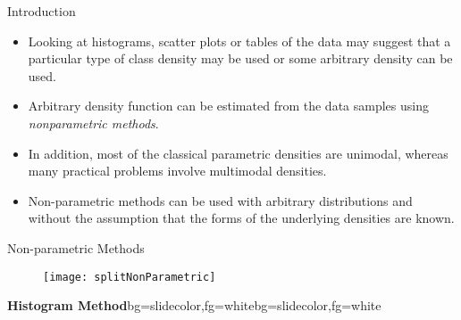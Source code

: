\begin{frame}{Introduction}
\begin{itemize}
\setlength{\itemsep}{8pt}
\item Looking at histograms, scatter plots or tables of the data may suggest that a particular type of class density may be used or {\color{mycolor2}some arbitrary density} can be used.
\item Arbitrary density function can be estimated from the data samples using \textit{\color{mycolor1}nonparametric methods}.
\item  In addition, most of the classical parametric densities are
{\color{mycolor2}unimodal}, whereas many practical problems involve {\color{mycolor2}multimodal} densities.
\item Non-parametric methods can be used with arbitrary
distributions and without the assumption that the forms of
the underlying densities are known.
\end{itemize}
\end{frame}

\begin{frame}{Non-parametric Methods}
\begin{figure}
\texttt{[image: splitNonParametric]}
\end{figure}
\end{frame}

\begin{frame}{}
\begin{variableblock}{\centering \Large \textbf{\vspace{4pt}\newline Histogram Method\vspace{4pt}}}{bg=slidecolor,fg=white}{bg=slidecolor,fg=white}
\end{variableblock}
\end{frame}


